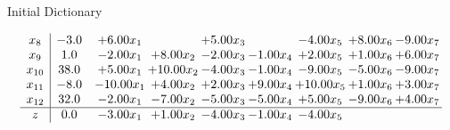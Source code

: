 \documentclass[8pt]{article}
\begin{document}
Initial Dictionary 

\[\begin{array}{c| c c@{\hskip 2pt} c@{\hskip 2pt} c@{\hskip 2pt} c@{\hskip 2pt} c@{\hskip 2pt} c@{\hskip 2pt} c@{\hskip 2pt} }
 x_{8}   &  -3.0 & +  6.00 x_{1} &   & +  5.00 x_{3} &   & -4.00 x_{5} & +  8.00 x_{6} & -9.00 x_{7}\\
 x_{9}   &  1.0 & -2.00 x_{1} & +  8.00 x_{2} & -2.00 x_{3} & -1.00 x_{4} & +  2.00 x_{5} & +  1.00 x_{6} & +  6.00 x_{7}\\
 x_{10}   &  38.0 & +  5.00 x_{1} & + 10.00 x_{2} & -4.00 x_{3} & -1.00 x_{4} & -9.00 x_{5} & -5.00 x_{6} & -9.00 x_{7}\\
 x_{11}   &  -8.0 & -10.00 x_{1} & +  4.00 x_{2} & +  2.00 x_{3} & +  9.00 x_{4} & + 10.00 x_{5} & +  1.00 x_{6} & +  3.00 x_{7}\\
 x_{12}   &  32.0 & -2.00 x_{1} & -7.00 x_{2} & -5.00 x_{3} & -5.00 x_{4} & +  5.00 x_{5} & -9.00 x_{6} & +  4.00 x_{7}\\
\hline
z    &  0.0 & -3.00 x_{1} & +  1.00 x_{2} & -4.00 x_{3} & -1.00 x_{4} & -4.00 x_{5} &    &   \\
\end{array}\]
\end{document}
